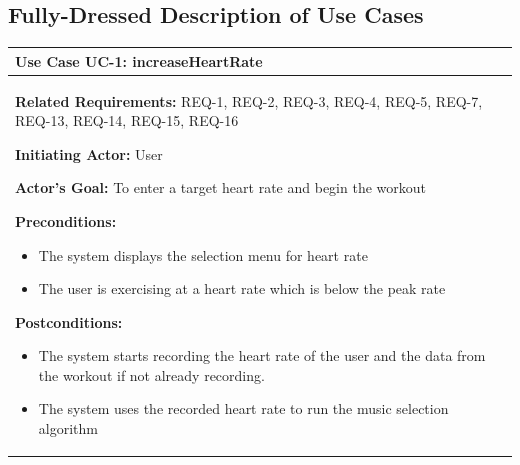 \documentclass[letterpaper,english, 12pt]{scrreprt}
\begin{document}
\subsection{Fully-Dressed Description of Use Cases}

\begin{center}
        \begin{tabular}{|C{15cm}|}
                \hline
                        \textbf{Use Case UC-1: increaseHeartRate}\\
                \hline
                        \begin{flushleft}
                                \textbf{Related Requirements: } REQ-1, REQ-2, REQ-3, REQ-4, REQ-5, REQ-7, REQ-13, REQ-14, REQ-15, REQ-16
                        \end{flushleft}
                        \begin{flushleft}
                                \textbf{Initiating Actor: } User
                        \end{flushleft}
                        \begin{flushleft}
                                \textbf{Actor's Goal: } To enter a target heart rate and begin the workout
                        \end{flushleft}
                        \begin{flushleft}
                                \textbf{Preconditions: }
                        \end{flushleft}
                                \begin{itemize}
                                        \item The system displays the selection menu for heart rate
                                        \item The user is exercising at a heart rate which is below the peak rate
                                \end{itemize}
                        \begin{flushleft}
                                \textbf{Postconditions: }
                        \end{flushleft}
                                \begin{itemize}
                                        \item The system starts recording the heart rate of the user and the data from the workout if not already recording.
                                        \item The system uses the recorded heart rate to run the music selection algorithm

\end{itemize}
\end{tabular}
\end{center}
\end{document}
